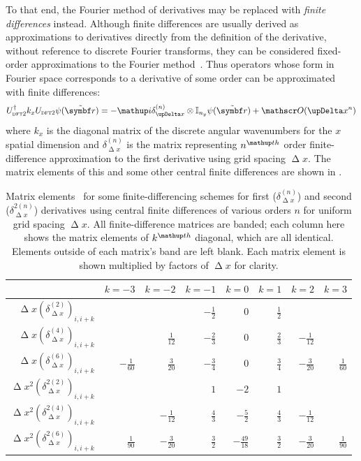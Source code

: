 To that end, the Fourier method of derivatives may be replaced with \emph{finite differences} instead. Although finite differences are usually derived as approximations to derivatives directly from the definition of the derivative, without reference to discrete Fourier transforms, they can be considered fixed-order approximations to the Fourier method~\cite{fornberg_pseudospectral_1987}. Thus operators whose form in Fourier space corresponds to a derivative of some order can be approximated with finite differences:
\begin{align}
U^\dagger_{\textsc{dft2}} k_x U_{\textsc{dft2}}\psi(\tilde{\vec r}) = 
-\ii\delta^{(n)}_{\upDelta x} \otimes \mathbb{I}_{n_y}\psi(\tilde{\vec r}) + \Ord{\upDelta x^n}
\end{align} 
where $k_x$ is the diagonal matrix of the discrete angular wavenumbers for the $x$ spatial dimension and $\delta^{(n)}_{\upDelta x}$ is the matrix representing $n^\up{th}$ order finite-difference approximation to the first derivative using grid spacing $\upDelta x$. The matrix elements of this and some other central finite differences are shown in .

\begin{table}
\centering
\begin{tabular}[c]{|r||rrrrrrr|}
\hline
 & $k=-3$ & $k=-2$ & $k=-1$ & $k=0$ & $k=1$ & $k=2$ & $k=3$\\
\hline
$\upDelta x\left(\delta^{(2)}_{\upDelta x}\right)_{i, i+k}$ 
& & & $-\frac{1}{2}$ & $0$ & $\frac{1}{2}$ & & \\
$\upDelta x\left(\delta^{(4)}_{\upDelta x}\right)_{i, i+k}$ 
& & $\frac{1}{12}$ & $-\frac{2}{3}$ & $0$ & $\frac{2}{3}$ & $-\frac{1}{12}$ & \\
$\upDelta x\left(\delta^{(6)}_{\upDelta x}\right)_{i, i+k}$ 
& $-\frac{1}{60}$ & $\frac{3}{20}$ & $-\frac{3}{4}$ & $0$ & $\frac{3}{4}$ & $-\frac{3}{20}$ & $\frac{1}{60}$\\
$\upDelta x^2\left(\delta^{2 (2)}_{\upDelta x}\right)_{i, i+k}$ 
& & & $1$ & $-2$ & $1$ & & \\
$\upDelta x^2\left(\delta^{2 (4)}_{\upDelta x}\right)_{i, i+k}$ 
& & $-\frac{1}{12}$ & $\frac{4}{3}$ & $-\frac{5}{2}$ & $\frac{4}{3}$ & $-\frac{1}{12}$ & \\
$\upDelta x^2\left(\delta^{2 (6)}_{\upDelta x}\right)_{i, i+k}$ 
& $\frac{1}{90}$ & $-\frac{3}{20}$ & $\frac{3}{2}$ & $-\frac{49}{18}$ & $\frac{3}{2}$ & $-\frac{3}{20}$ & $\frac{1}{90}$\\
\hline
\end{tabular}
\caption{Matrix elements~\cite{fornberg_generation_1988} for some finite-differencing schemes for first ($\delta^{(n)}_{\upDelta x}$) and second ($\delta^{2 (n)}_{\upDelta x}$) derivatives using central finite differences of various orders $n$ for uniform grid spacing $\upDelta x$. All finite-difference matrices are banded; each column here shows the matrix elements of $k^\up{th}$ diagonal, which are all identical. Elements outside of each matrix's band are left blank. Each matrix element is shown multiplied by factors of $\upDelta x$ for clarity.}\label{table:fd_matrixels}
\end{table}

